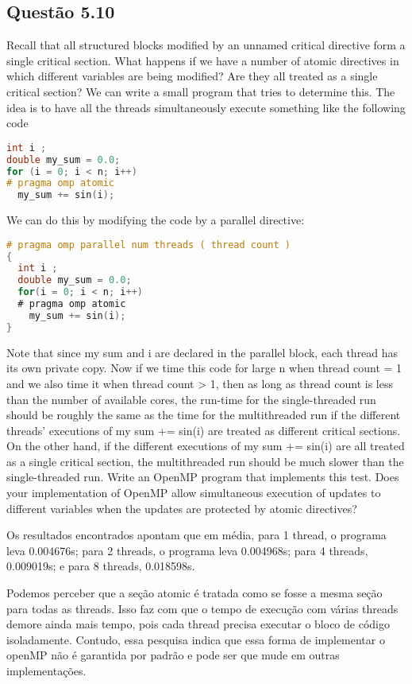 
\subsection{Questão 5.10}

Recall that all structured blocks modified by an unnamed critical directive form a single critical section. What happens if we have a number of atomic directives in which different variables are being modified? Are they all treated as a single critical section?
We can write a small program that tries to determine this. The idea is to have all the threads simultaneously execute something like the following code

\begin{lstlisting}[language=C]
int i ;
double my_sum = 0.0;
for (i = 0; i < n; i++)
# pragma omp atomic
  my_sum += sin(i);
\end{lstlisting}


We can do this by modifying the code by a parallel directive:

\begin{lstlisting}[language=C]
# pragma omp parallel num threads ( thread count )
{
  int i ;
  double my_sum = 0.0;
  for(i = 0; i < n; i++)
  # pragma omp atomic
    my_sum += sin(i);
}
\end{lstlisting}


Note that since my sum and i are declared in the parallel block, each thread has its own private copy. Now if we time this code for large n when thread count = 1 and we also time it when thread count > 1, then as long as thread count is less than the number of available cores, the run-time for the single-threaded run should be roughly the same as the time for the multithreaded run if the different threads’ executions of my sum += sin(i) are treated as different critical sections. On the other hand, if the different executions of my sum += sin(i) are all treated as a single critical section, the multithreaded run should be much slower than the single-threaded run. Write an OpenMP program that implements this test. Does your implementation of OpenMP allow simultaneous execution of updates to different variables when the updates are protected by atomic directives?




Os resultados encontrados apontam que em média, para 1 thread, o programa leva 0.004676s; para 2 threads, o programa leva 0.004968s; para 4 threads, 0.009019s; e para 8 threads, 0.018598s.

Podemos perceber que a seção atomic é tratada como se fosse a mesma seção para todas as threads. Isso faz com que o tempo de execução com várias threads demore ainda mais tempo, pois cada thread precisa executar o bloco de código isoladamente. Contudo, essa pesquisa indica que essa forma de implementar o openMP não é garantida por padrão e pode ser que mude em outras implementações.


